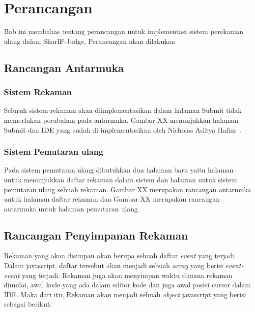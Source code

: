 \chapter{Perancangan}
\label{chap:perancangan}

Bab ini membahas tentang perancangan untuk implementasi sistem perekaman ulang dalam SharIF-Judge. Perancangan akan dilakukan 

\section{Rancangan Antarmuka}

\subsection{Sistem Rekaman}

Seluruh sistem rekaman akan diimplementasikan dalam halaman Submit tidak memerlukan perubahan pada antarmuka. Gambar XX menunjukkan halaman Submit dan IDE yang sudah di implementasikan oleh Nicholas Aditya Halim~\cite{nicholas:sharif}.

\subsection{Sistem Pemutaran ulang}

Pada sistem pemutaran ulang dibutuhkan dua halaman baru yaitu halaman untuk menunjukkan daftar rekaman dalam sistem dan halaman untuk sistem pemutaran ulang sebuah rekaman. Gambar XX merupakan rancangan antarmuka untuk halaman daftar rekaman dan Gambar XX merupakan rancangan antarmuka untuk halaman pemutaran ulang.


\section{Rancangan Penyimpanan Rekaman}

Rekaman yang akan disimpan akan berupa sebuah daftar \textit{event} yang terjadi. Dalam javascript, daftar tersebut akan menjadi sebuah \textit{array} yang berisi \textit{event-event} yang terjadi. Rekaman juga akan menyimpan waktu dimana rekaman dimulai, awal kode yang ada dalam editor kode dan juga awal posisi cursor dalam IDE. Maka dari itu, Rekaman akan menjadi sebuah \textit{object} javascript yang berisi sebagai berikut:

